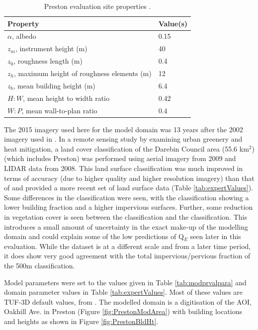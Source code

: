 \documentclass[final,3p,times,authoryear]{elsarticle}
\begin{document}
\begin{table}[!htbp]
\caption{Preston evaluation site properties \citep{Coutts2007}. \label{tab:prvalpara}}     
\begin{tabular}{| l | l |}
\hline
\textbf{Property} & \textbf{Value(s)} \\ \hline
$\alpha$, albedo & 0.15  \\ \hline
$z_{m}$, instrument height (m)&  40  \\ \hline
$z_{0}$, roughness length (m)& 0.4  \\ \hline
$z_{h}$, maximum height of roughness elements (m)& 12  \\ \hline
$z_{b}$, mean building height (m)& 6.4  \\ \hline
$H:W$, mean height to width ratio& 0.42  \\ \hline
$W:P$, mean wall-to-plan ratio &0.4  \\ \hline
\end{tabular}
\end{table}

The 2015 imagery used here for the model domain was 13 years after the 2002 imagery used in \cite{Coutts2007}. In a remote sensing study by \cite{Nury2015} examining urban greenery and heat mitigation, a land cover classification of the Darebin Council area (55.6 km$^{2}$) (which includes Preston) was performed using aerial imagery from 2009 and LIDAR data from 2008. This land surface classification was much improved in terms of accuracy (due to higher quality and higher resolution imagery) than that of \cite{Coutts2007} and provided a more recent set of land surface data (Table \ref{tab:expertValues}). Some differences in the classification were seen, with the \cite{Nury2015} classification showing a lower building fraction and a higher impervious surfaces. Further, some reduction in vegetation cover is seen between the \cite{Coutts2007} classification and the \cite{Nury2015} classification. This introduces a small amount of uncertainty in the exact make-up of the modelling domain and could explain some of the low predictions of Q$_{E}$ seen later in this evaluation. While the \cite{Nury2015} dataset is at a different scale and from a later time period, it does show very good agreement with the total impervious/pervious fraction of the 500m classification.


Model parameters were set to the values given in Table \ref{tab:modprvalpara} and domain parameter values in Table \ref{tab:expertValues}. Most of these values are TUF-3D default values, from \cite{Krayenhoff2007}. The modelled domain is a digitisation of the AOI, Oakhill Ave. in Preston (Figure \ref{fig:PrestonModArea}) with building locations and heights as shown in Figure \ref{fig:PrestonBldHt}.
\end{document}
